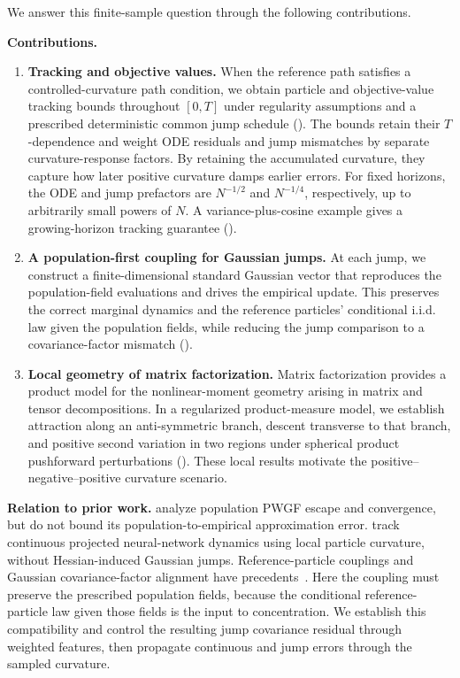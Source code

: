 We answer this finite-sample question through the following contributions.

\noindent\textbf{Contributions.}
\begin{enumerate}[leftmargin=1.35em,label=\arabic*.,itemsep=0.01em,topsep=0.05pt,parsep=5pt]
    \item \textbf{Tracking and objective values.}
    When the reference path satisfies a controlled-curvature path condition,
    we obtain particle and objective-value tracking bounds throughout \([0,T]\)
    under regularity assumptions and a prescribed deterministic common jump schedule
    ().
    The bounds retain their \(T\)-dependence and weight ODE residuals and jump
    mismatches by separate curvature-response factors. By retaining the
    accumulated curvature, they capture how later positive curvature damps
    earlier errors. For fixed horizons, the ODE and jump prefactors are
    \(N^{-1/2}\) and \(N^{-1/4}\), respectively, up to arbitrarily small powers of \(N\).
    A variance-plus-cosine example gives a growing-horizon tracking guarantee
    ().

    \item \textbf{A population-first coupling for Gaussian jumps.}
    At each jump, we construct a finite-dimensional standard Gaussian vector that
    reproduces the population-field evaluations and drives the empirical update.
    This preserves the correct marginal dynamics and the reference particles'
    conditional i.i.d. law given the population fields, while reducing the jump
    comparison to a covariance-factor mismatch
    ().

    \item \textbf{Local geometry of matrix factorization.}
    Matrix factorization provides a product model for the nonlinear-moment
    geometry arising in matrix and tensor decompositions. In a regularized
    product-measure model, we establish attraction along an anti-symmetric
    branch, descent transverse to that branch, and positive second variation
    in two regions under spherical product pushforward perturbations
    (). These local results motivate the
    positive--negative--positive curvature scenario.
\end{enumerate}

\noindent\textbf{Relation to prior work.}
\citet{yamamoto2025hessianguided} analyze population PWGF escape and convergence,
but do not bound its population-to-empirical approximation error.
\citet{glasgow2025meanfield} track continuous projected neural-network dynamics
using local particle curvature, without Hessian-induced Gaussian jumps.
Reference-particle couplings and Gaussian covariance-factor alignment have
precedents~\citep{sznitman1991,masarotto2019procrustes}. Here the coupling must
preserve the prescribed population fields, because the conditional
reference-particle law given those fields is the input to concentration.
We establish this compatibility and control the resulting jump covariance
residual through weighted features, then propagate continuous and jump errors
through the sampled curvature.

